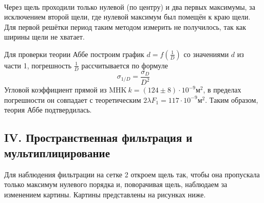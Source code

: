 \newline
\
\newline


Через щель проходили только нулевой (по центру) и два первых максимумы, за исключением второй щели, где нулевой максимум был помещён к краю щели. Для первой решётки
период таким методом измерить не получилось, так как ширины щели не хватает.

Для проверки теории Аббе построим график $d=f\left(\frac{1}{D}\right)$ со значениями $d$ из части 1, погрешность $\frac{1}{D}$ рассчитывается по формуле
$$
\sigma_{1 / D}=\frac{\sigma_{D}}{D^{2}}
$$
Угловой коэффициент прямой из $\mathrm{MHK}\ k=(124 \pm 8) \cdot 10^{-9} м^{2}$, в пределах погрешности он совпадает с теоретическим $2 \lambda F_{1}= 117\cdot 10^{-9} м^{2} .$ Таким образом, теория Аббе подтвердилась. 


\newpage
   
 \subsection*{IV. Пространственная фильтрация и мультиплицирование}
 
 Для наблюдения фильтрации на сетке 2 откроем щель так, чтобы она пропускала только максимум нулевого порядка и, поворачивая щель, наблюдаем за изменением картины. Картины представлены на рисунках ниже. \\
 
